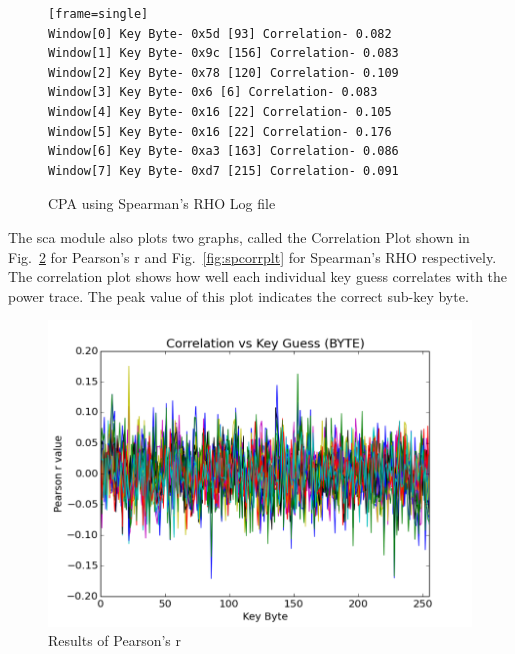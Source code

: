 \begin{figure}[h]
\begin{verbatim}[frame=single]
Window[0] Key Byte- 0x5d [93] Correlation- 0.082
Window[1] Key Byte- 0x9c [156] Correlation- 0.083
Window[2] Key Byte- 0x78 [120] Correlation- 0.109
Window[3] Key Byte- 0x6 [6] Correlation- 0.083
Window[4] Key Byte- 0x16 [22] Correlation- 0.105
Window[5] Key Byte- 0x16 [22] Correlation- 0.176
Window[6] Key Byte- 0xa3 [163] Correlation- 0.086
Window[7] Key Byte- 0xd7 [215] Correlation- 0.091
\end{verbatim}
\caption{\label{fig:spearman}CPA using Spearman's RHO Log file }
\end{figure}

The sca module also plots two graphs, called the Correlation Plot 
shown in Fig.~\ref{fig:prcorrplt} for Pearson's r and Fig.~\ref{fig:spcorrplt} for 
Spearman's RHO respectively.  
The correlation plot shows how well each individual key guess correlates with the power trace.
The peak value of this plot indicates the correct sub-key byte. 

\begin{figure}[H]
\begin{center}
\includegraphics[scale=0.8]{figures/pearson-r}
\caption{\label{fig:prcorrplt}Results of Pearson's r}
\end{center} 
\vspace{-3ex}
\end{figure}

